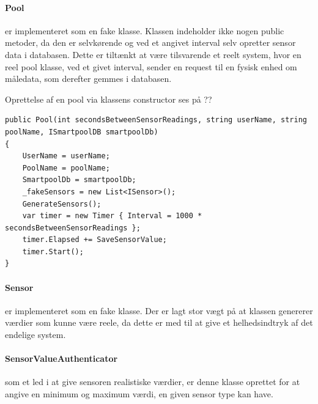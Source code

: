 \paragraph{Pool} er implementeret som en fake klasse. Klassen indeholder ikke nogen public metoder, da den er selvkørende og ved et angivet interval selv opretter sensor data i databasen. Dette er tiltænkt at være tilsvarende et reelt system, hvor en reel pool klasse, ved et givet interval, sender en request til en fysisk enhed om måledata, som derefter gemmes i databasen.

Oprettelse af en pool via klassens constructor ses på ??
\begin{lstlisting}[caption=Server.FakePool.Constructor, label=code:ServerFakePoolConstructor]
public Pool(int secondsBetweenSensorReadings, string userName, string poolName, ISmartpoolDB smartpoolDb)
{
	UserName = userName;
	PoolName = poolName;
	SmartpoolDb = smartpoolDb;
	_fakeSensors = new List<ISensor>();
	GenerateSensors();
	var timer = new Timer { Interval = 1000 * secondsBetweenSensorReadings };
	timer.Elapsed += SaveSensorValue;
	timer.Start();
}
\end{lstlisting}

\paragraph{Sensor} er implementeret som en fake klasse. Der er lagt stor vægt på at klassen genererer værdier som kunne være reele, da dette er med til at give et helhedsindtryk af det endelige system. 

\paragraph{SensorValueAuthenticator} som et led i at give sensoren realistiske værdier, er denne klasse oprettet for at angive en minimum og maximum værdi, en given sensor type kan have.